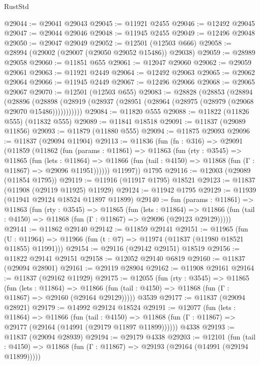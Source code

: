 \begin{lexlean}{RustStd}
\begin{coremodule}
{\begin{coremodule}
{{{{{{{{{{{{{{{{{{{{{{{{{{{{{{{{{{{{{{{{{{{{{{{{{{@29044 := @29041 @29043
@29045 := @11921 @2455
@29046 := @12492 @29045
@29047 := @29044 @29046
@29048 := @11945 @2455
@29049 := @12496 @29048
@29050 := @29047 @29049
@29052 := @12501 (@12503 @666)
@29058 := @28994 (@29002 (@29007 (@29050 @29052 @15486)) @29038)
@29059 := @28989 @29058
@29060 := @11851 @655
@29061 := @12047 @29060
@29062 := @29059 @29061
@29063 := @11921 @2449
@29064 := @12492 @29063
@29065 := @29062 @29064
@29066 := @11945 @2449
@29067 := @12496 @29066
@29068 := @29065 @29067
@29070 := @12501 (@12503 @655)
@29083 := @28828
    (@28853
      (@28894
        (@28896
          (@28898 (@28919 (@28937 (@28951 (@28964 (@28975 (@28979 (@29068 @29070 @15486)))))))))))
@29084 := @11820 @555
@29088 := @11822 (@11826 @555) (@11832 @555)
@29089 := @11841 @18518
@29091 := @11837 (@29089 @11856)
@29093 := @11879 (@11880 @555)
@29094 := @11875 @29093
@29096 := @11837 (@29094 @11904)
@29113 := @11836
    (fun (fn : @316) =>
    @29091
      (@11859
        (@11862
          (fun (params : @11861) =>
          @11863
            (fun (rty : @3545) =>
            @11865
              (fun (lets : @11864) =>
              @11866 (fun (tail : @4150) => @11868 (fun (Γ : @11867) => @29096 @11951))))))
        @11997))
    @1795
@29116 := @12003 (@29089 (@11854 @1795))
@29119 := @11916 (@11917 @1795) @18521
@29123 := @11837 (@11908 (@29119 @11925) @11929)
@29124 := @11942 @1795
@29129 := @11939 (@11941 @29124 @18524 @11897 @11899)
@29140 := fun (params : @11861) =>
  @11863
    (fun (rty : @3545) =>
    @11865
      (fun (lets : @11864) =>
      @11866 (fun (tail : @4150) => @11868 (fun (Γ : @11867) => @29096 (@29123 @29129)))))
@29141 := @11862 @29140
@29142 := @11859 @29141
@29151 := @11965
    (fun (U : @11964) => @11966 (fun (t : @7) => @11974 (@11837 (@11980 @18521 @11855) @11991)))
@29154 := @29116 (@29142 @29151) @18519
@29156 := @11822 @29141 @29151
@29158 := @12052 @29140 @6819
@29160 := @11837 (@29094 @28901)
@29161 := @29119 @28904
@29162 := @11908 @29161
@29164 := @11837 (@29162 @11929)
@29175 := @12055
    (fun (rty : @3545) =>
    @11865
      (fun (lets : @11864) =>
      @11866 (fun (tail : @4150) => @11868 (fun (Γ : @11867) => @29160 (@29164 @29129)))))
    @3539
@29177 := @11837 (@29094 @28921)
@29179 := @14992 @29124 @18524
@29191 := @12077
    (fun (lets : @11864) =>
    @11866
      (fun (tail : @4150) =>
      @11868 (fun (Γ : @11867) => @29177 (@29164 (@14991 (@29179 @11897 @11899))))))
    @4338
@29193 := @11837 (@29094 @28939)
@29194 := @29179 @4338
@29203 := @12101
    (fun (tail : @4150) => @11868 (fun (Γ : @11867) => @29193 (@29164 (@14991 (@29194 @11899)))))
}}}}}}}}}}}}}}}}}}}}}}}}}}}}}}}}}}}}}}}}}}}}}}}}}}
\end{coremodule}}
\end{coremodule}
\end{lexlean}
